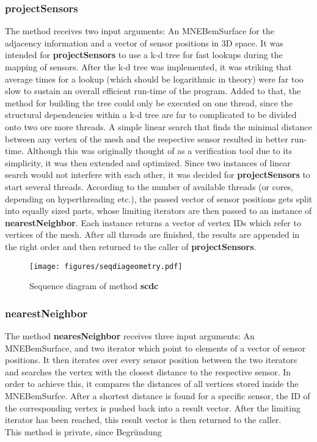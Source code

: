 \subsubsection{projectSensors}
The method  receives two input arguments: An MNEBemSurface for the adjacency information and a vector of sensor positions in 3D space. It was intended for \textbf{projectSensors} to use a k-d tree for fast lookups during the mapping of sensors. After the k-d tree was implemented, it was striking that average times for a lookup (which should be logarithmic in theory) were far too slow to sustain an overall efficient run-time of the program. Added to that, the method for building the tree could only be executed on one thread, since the structural dependencies within a k-d tree are far to complicated to be divided onto two ore more threads. A simple linear search that finds the minimal distance between any vertex of the mesh and the respective sensor resulted in better run-time. Although this was originally thought of as a verification tool due to its simplicity, it was then extended and optimized.
Since two instances of linear search would not interfere with each other, it was decided for \textbf{projectSensors} to start several threads.
According to the number of available threads (or cores, depending on hyperthreading etc.), the passed vector of sensor positions gets split into equally sized parts, whose limiting iterators are then passed to an instance of \textbf{nearestNeighbor}. Each instance returns a vector of vertex IDs which refer to vertices of the mesh. After all threads are finished, the results are appended in the right order and then returned to the caller of \textbf{projectSensors}.

\clearpage

\begin{figure}[h]
	\begin{center}
		\texttt{[image: figures/seqdiageometry.pdf]}
		\caption{Sequence diagram of method \textbf{scdc}}
	\end{center}
\end{figure}

\clearpage

\subsubsection{nearestNeighbor}
The method \textbf{nearesNeighbor} receives three input arguments: An MNEBemSurface, and two iterator which point to elements of a vector of sensor positions.
It then iterates over every sensor position between the two iterators and searches the vertex with the closest distance to the respective sensor. In order to achieve this, it compares the distances of all vertices stored inside the MNEBemSurfce. After a shortest distance is found for a specific sensor, the ID of the corresponding vertex is pushed back into a result vector. After the limiting iterator has been reached, this result vector is then returned to the caller.\\
This method is private, since Begründung

